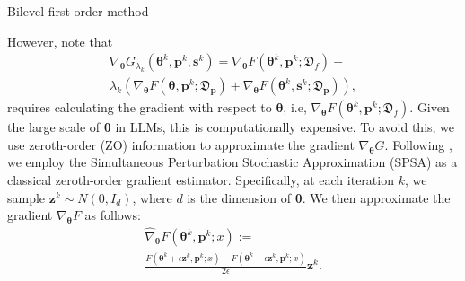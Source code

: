 \begin{algorithm}[!ht]
\caption{ Bilevel first-order  method}\label{minimax_algorithm}
\begin{algorithmic}[1]
\ENDFOR
{}
\ENDFOR
\end{algorithmic}
\end{algorithm}

However, note that
\begin{multline}\label{grad}
  \nabla_{ \bm{\theta}} G_{\lambda_k}({ \bm{\theta}}^k,{ \mathbf{p}}^k,{ \mathbf{s}}^k) =  
  \nabla_{{ \bm{\theta}}} F({ \bm{\theta}}^k, { \mathbf{p}}^k;\mathfrak{D}_f) + \\
  \lambda_k(   \nabla_{{ \bm{\theta}}}F({ \bm{\theta}}, { \mathbf{p}}^k;\mathfrak{D}_{ \mathbf{p}}) + 
  \nabla_{{ \bm{\theta}}}F({ \bm{\theta}}^k, { \mathbf{s}}^k;\mathfrak{D}_{ \mathbf{p}})),
\end{multline}
requires calculating the gradient with respect to ${ \bm{\theta}}$, i.e, $\nabla_{{ \bm{\theta}}} F({ \bm{\theta}}^k, { \mathbf{p}}^k;\mathfrak{D}_f)$. Given the large scale of ${ \bm{\theta}}$ in LLMs, this is computationally expensive. To avoid this, we use zeroth-order (ZO) information to approximate the gradient $\nabla_{ \bm{\theta}} G$. Following \cite{MalladiGNDL0A23Mezo, ZhangLHLZZCLY0W24Zobench, GuoLZLY24}, we employ the Simultaneous Perturbation Stochastic Approximation (SPSA) as a classical zeroth-order gradient estimator. Specifically, at each iteration $k$, we sample ${ \mathbf{z}}^k \sim N(0, I_d)$, where $d$ is the dimension of ${ \bm{\theta}}$. We then approximate the gradient $\nabla_{\bm{\theta}}F$ as follows:
\begin{multline}\label{ZO_grad}
  \hat{\nabla}_{{ \bm{\theta}}} F({ \bm{\theta}}^k, { \mathbf{p}}^k;x) := \\
  \frac{F({ \bm{\theta}}^k + \epsilon { \mathbf{z}}^k, { \mathbf{p}}^k;x) - F({ \bm{\theta}}^k - \epsilon { \mathbf{z}}^k, { \mathbf{p}}^k;x)}{2\epsilon}{ \mathbf{z}}^k.
\end{multline}


